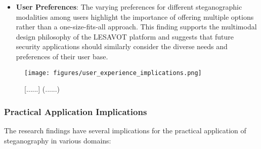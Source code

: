 \documentclass[12pt, a4paper, oneside]{book}
\begin{document}
\begin{itemize}[leftmargin=*]
    \item \textbf{User Preferences}: The varying preferences for different steganographic modalities among users highlight the importance of offering multiple options rather than a one-size-fits-all approach. This finding supports the multimodal design philosophy of the LESAVOT platform and suggests that future security applications should similarly consider the diverse needs and preferences of their user base.
\end{itemize}

\begin{figure}[htbp]
    \centering
    \texttt{[image: figures/user\_experience\_implications.png]}
    \caption{[......] (......)}
    \label{fig:ux_implications}
\end{figure}

\subsubsection{Practical Application Implications}

The research findings have several implications for the practical application of steganography in various domains:
\end{document}
